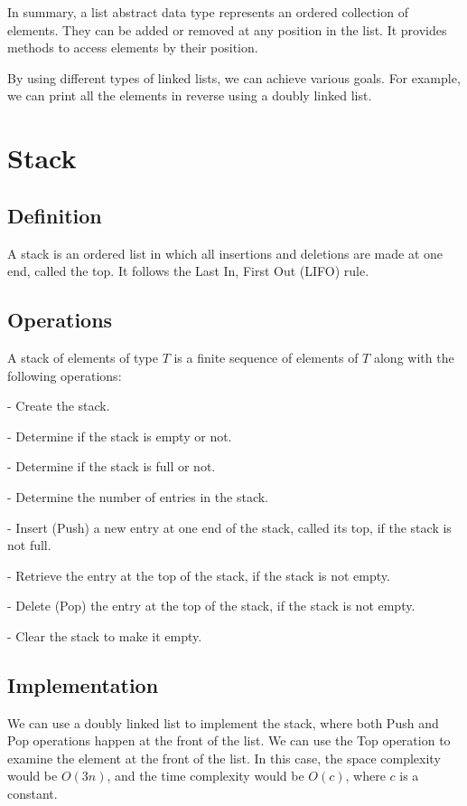 In summary, a list abstract data type represents an ordered collection of elements. They can be added or removed at any position in the list. It provides methods to access elements by their position.

By using different types of linked lists, we can achieve various goals. For example, we can print all the elements in reverse using a doubly linked list.

\section{Stack}
\subsection{Definition}
A stack is an ordered list in which all insertions and deletions are made at one end, called the top. It follows the Last In, First Out (LIFO) rule.

\subsection{Operations}
A stack of elements of type \(T\) is a finite sequence of elements of \(T\) along with the following operations:

- Create the stack. 

- Determine if the stack is empty or not.

- Determine if the stack is full or not.

- Determine the number of entries in the stack.

- Insert (Push) a new entry at one end of the stack, called its top, if the stack is not full.

- Retrieve the entry at the top of the stack, if the stack is not empty.

- Delete (Pop) the entry at the top of the stack, if the stack is not empty.

- Clear the stack to make it empty.

\subsection{Implementation}
We can use a doubly linked list to implement the stack, where both Push and Pop operations happen at the front of the list. We can use the Top operation to examine the element at the front of the list. In this case, the space complexity would be \(O(3n)\), and the time complexity would be \(O(c)\), where \(c\) is a constant.

